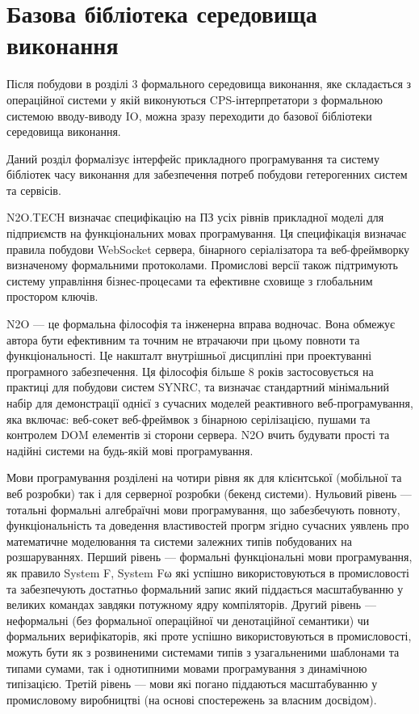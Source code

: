 \chapter{Базова бібліотека середовища виконання}

Після побудови в розділі 3 формального середовища виконання,
яке складається з операційної системи у якій виконуються
CPS-інтерпретатори з формальною системою вводу-виводу IO, можна зразу
переходити до базової бібліотеки середовища виконання.

Даний розділ формалізує інтерфейс прикладного програмування та систему
бібліотек часу виконання для забезпечення потреб побудови гетерогенних систем та сервісів.

N2O.TECH визначає специфікацію на ПЗ усіх рівнів прикладної моделі
для підприємств на функціональних мовах програмування. Ця
специфікація визначає правила побудови WebSocket сервера,
бінарного серіалізатора та веб-фреймворку визначеному
формальними протоколами. Промислові версії також підтримують
систему управління бізнес-процесами та ефективне сховище
з глобальним простором ключів.

N2O — це формальна філософія та інженерна вправа водночас.
Вона обмежує автора бути ефективним та точним не втрачаючи
при цьому повноти та функціональності. Це накшталт внутрішньої
дисципліні при проектуванні програмного забезпечення. Ця філософія
більше 8 років застосовується на практиці для побудови систем SYNRC,
та визначає стандартний мінімальний набір для демонстрації однієї
з сучасних моделей реактивного веб-програмування, яка включає: веб-сокет
веб-фреймвок з бінарною серілізацією, пушами та контролем DOM елементів
зі сторони сервера. N2O вчить будувати прості та надійні системи
на будь-якій мові програмування.

Мови програмування розділені на чотири рівня як для клієнтської
(мобільної та веб розробки) так і для серверної розробки (бекенд
системи). Нульовий рівень — тотальні формальні алгебраїчні мови
програмування, що забезбечують повноту, функціональність та доведення
властивостей прогрм згідно сучасних уявлень про математичне моделювання
та системи залежних типів побудованих на розшаруваннях. Перший
рівень — формальні функціональні мови програмування, як правило
System F, System Fω які успішно використовуються в промисловості
та забезпечують достатньо формальний запис який піддається
масштабуванню у великих командах завдяки потужному ядру компіляторів.
Другий рівень — неформальні (без формальної операційної чи денотаційної
семантики) чи формальних верифікаторів, які проте успішно
використовуються в промисловості, можуть бути як з розвиненими
системами типів з узагальненими шаблонами та типами сумами,
так і однотипними мовами програмування з динамічною типізацією.
Третій рівень — мови які погано піддаються масштабуванню у
промисловому виробництві (на основі спостережень за власним досвідом).

